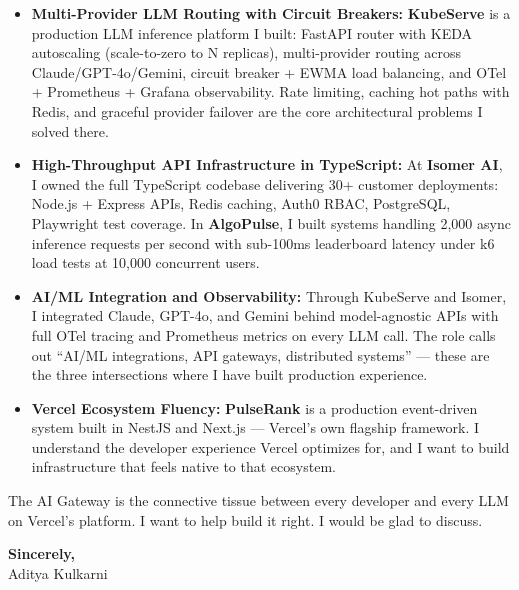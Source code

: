 \documentclass[11pt,letterpaper]{article}
\begin{document}
\vspace{4pt}
\begin{itemize}[leftmargin=*, itemsep=3pt, label={\color{VercelBlack}\faAngleRight}]
    \item \textbf{Multi-Provider LLM Routing with Circuit Breakers:} \textbf{KubeServe} is a production LLM inference platform I built: FastAPI router with KEDA autoscaling (scale-to-zero to N replicas), multi-provider routing across Claude/GPT-4o/Gemini, circuit breaker + EWMA load balancing, and OTel + Prometheus + Grafana observability. Rate limiting, caching hot paths with Redis, and graceful provider failover are the core architectural problems I solved there.

    \item \textbf{High-Throughput API Infrastructure in TypeScript:} At \textbf{Isomer AI}, I owned the full TypeScript codebase delivering 30+ customer deployments: Node.js + Express APIs, Redis caching, Auth0 RBAC, PostgreSQL, Playwright test coverage. In \textbf{AlgoPulse}, I built systems handling 2,000 async inference requests per second with sub-100ms leaderboard latency under k6 load tests at 10,000 concurrent users.

    \item \textbf{AI/ML Integration and Observability:} Through KubeServe and Isomer, I integrated Claude, GPT-4o, and Gemini behind model-agnostic APIs with full OTel tracing and Prometheus metrics on every LLM call. The role calls out ``AI/ML integrations, API gateways, distributed systems'' --- these are the three intersections where I have built production experience.

    \item \textbf{Vercel Ecosystem Fluency:} \textbf{PulseRank} is a production event-driven system built in NestJS and Next.js --- Vercel's own flagship framework. I understand the developer experience Vercel optimizes for, and I want to build infrastructure that feels native to that ecosystem.
\end{itemize}
\vspace{6pt}

The AI Gateway is the connective tissue between every developer and every LLM on Vercel's platform. I want to help build it right. I would be glad to discuss.

\vspace{12pt}
\textbf{Sincerely,}\\[8pt]
Aditya Kulkarni
\end{document}
